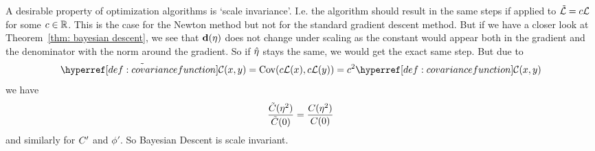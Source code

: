 A desirable property of optimization algorithms is `scale invariance'. I.e.
the algorithm should result in the same steps if applied to
\(\tilde{\mathcal{L}}=c\mathcal{L}\) for some \(c\in\mathbb{R}\). This is the case for the
Newton method but not for the standard gradient descent method. But if we have
a closer look at Theorem~\ref{thm: bayesian descent}, we see that
\(\mathbf{d}(\eta)\) does not change under scaling as the constant would appear both
in the gradient and the denominator with the norm around the gradient. So
if \(\hat{\eta}\) stays the same, we would get the exact same step. But
due to
\begin{equation*}
	\tilde{\C}(x,y) = \Cov(c\Loss(x), c\Loss(y)) = c^2 \C(x,y)
\end{equation*}
we have
\begin{equation*}
	\frac{\tilde{C}(\eta^2)}{\tilde{C}(0)}=\frac{C(\eta^2)}{C(0)}
\end{equation*}
and similarly for \(C'\) and \(\phi'\). So Bayesian Descent is scale
invariant.


